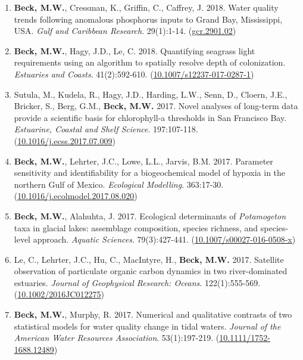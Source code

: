 \documentclass[letterpaper,12pt]{article}
\begin{document}
\begin{enumerate}
\item \textbf{Beck, M.W.}, Cressman, K., Griffin, C., Caffrey, J. 2018. Water quality trends following anomalous phosphorus inputs to Grand Bay, Mississippi, USA. \textit{Gulf and Caribbean Research}. 29(1):1-14. ({\footnotesize\href{https://aquila.usm.edu/gcr/vol29/iss1/2/}{gcr.2901.02}})

\item \textbf{Beck, M.W.}, Hagy, J.D., Le, C. 2018. Quantifying seagrass light requirements using an algorithm to spatially resolve depth of colonization. \textit{Estuaries and Coasts}. 41(2):592-610. ({\footnotesize\href{http://dx.doi.org/10.1007/s12237-017-0287-1}{10.1007/s12237-017-0287-1}})

\item Sutula, M., Kudela, R., Hagy, J.D., Harding, L.W., Senn, D., Cloern, J.E., Bricker, S., Berg, G.M., \textbf{Beck, M.W.} 2017. Novel analyses of long-term data provide a scientific basis for chlorophyll-a thresholds in San Francisco Bay. \textit{Estuarine, Coastal and Shelf Science}. 197:107-118. ({\footnotesize\href{https://doi.org/10.1016/j.ecss.2017.07.009}{10.1016/j.ecss.2017.07.009}})

\item \textbf{Beck, M.W.}, Lehrter, J.C., Lowe, L.L., Jarvis, B.M. 2017. Parameter sensitivity and identifiability for a biogeochemical model of hypoxia in the northern Gulf of Mexico. \textit{Ecological Modelling}. 363:17-30. ({\footnotesize\href{http://dx.doi.org/10.1016/j.ecolmodel.2017.08.020}{10.1016/j.ecolmodel.2017.08.020}})

\item \textbf{Beck, M.W.}, Alahuhta, J. 2017. Ecological determinants of \textit{Potamogeton} taxa in glacial lakes: assemblage composition, species richness, and species-level approach. \textit{Aquatic Sciences}. 79(3):427-441. ({\footnotesize\href{https://doi.org/10.1007/s00027-016-0508-x}{10.1007/s00027-016-0508-x}})

\item Le, C., Lehrter, J.C., Hu, C., MacIntyre, H., \textbf{Beck, M.W.} 2017. Satellite observation of particulate organic carbon dynamics in two river-dominated estuaries. \textit{Journal of Geophysical Research: Oceans}. 122(1):555-569. ({\footnotesize\href{http://dx.doi.org/10.1002/2016JC012275}{10.1002/2016JC012275}})

\item \textbf{Beck, M.W.}, Murphy, R. 2017. Numerical and qualitative contrasts of two statistical models for water quality change in tidal waters. \textit{Journal of the American Water Resources Association}. 53(1):197-219. ({\footnotesize\href{http://dx.doi.org/10.1111/1752-1688.12489}{10.1111/1752-1688.12489}})


\end{enumerate}
\end{document}
